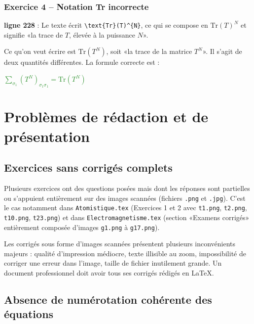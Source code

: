 \documentclass[12pt,a4paper]{article}
\newcommand{\fichier}[1]{\texttt{\small\color{Purple}#1}}
\newcommand{\ligne}[1]{\textbf{ligne #1}}
\newcommand{\correct}[1]{\textcolor{ForestGreen}{\textbf{#1}}}
\begin{document}
\subsubsection{Exercice 4 -- Notation Tr incorrecte}

\begin{avertissement}
\ligne{228} : Le texte écrit \verb|\text{Tr}(T)^{N}|, ce qui se compose en $\text{Tr}(T)^N$ et signifie «la trace de $T$, élevée à la puissance $N$».

Ce qu'on veut écrire est $\text{Tr}(T^N)$, soit «la trace de la matrice $T^N$». Il s'agit de deux quantités différentes. La formule correcte est :

\correct{$\displaystyle\sum_{\sigma_1}(T^N)_{\sigma_1\sigma_1} = \text{Tr}(T^N)$}
\end{avertissement}

\section{Problèmes de rédaction et de présentation}

\subsection{Exercices sans corrigés complets}

Plusieurs exercices ont des questions posées mais dont les réponses sont partielles ou s'appuient entièrement sur des images scannées (fichiers \fichier{.png} et \fichier{.jpg}). C'est le cas notamment dans \fichier{Atomistique.tex} (Exercices 1 et 2 avec \fichier{t1.png}, \fichier{t2.png}, \fichier{t10.png}, \fichier{t23.png}) et dans \fichier{Electromagnetisme.tex} (section «Examens corrigés» entièrement composée d'images \fichier{g1.png} à \fichier{g17.png}).

\begin{avertissement}
Les corrigés sous forme d'images scannées présentent plusieurs inconvénients majeurs : qualité d'impression médiocre, texte illisible au zoom, impossibilité de corriger une erreur dans l'image, taille de fichier inutilement grande. Un document professionnel doit avoir tous ses corrigés rédigés en \LaTeX.
\end{avertissement}

\subsection{Absence de numérotation cohérente des équations}
\end{document}
